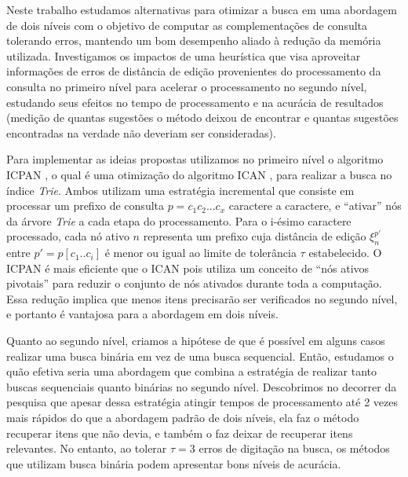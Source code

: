 Neste trabalho estudamos alternativas para otimizar a busca em uma abordagem de dois níveis com o objetivo de computar as complementações de consulta tolerando erros, mantendo um bom desempenho aliado à redução da memória utilizada. Investigamos os impactos de uma heurística que visa aproveitar informações de erros de distância de edição provenientes do processamento da consulta no primeiro nível para acelerar o processamento no segundo nível, estudando seus efeitos no tempo de processamento e na acurácia de resultados (medição de quantas sugestões o método deixou de encontrar e quantas sugestões encontradas na verdade não deveriam ser consideradas). 

Para implementar as ideias propostas utilizamos no primeiro nível o algoritmo ICPAN \citep{li2011efficient}, o qual é uma otimização do algoritmo ICAN \citep{ji2009efficient}, para realizar a busca no índice \textit{Trie}. Ambos utilizam uma estratégia incremental que consiste em processar um prefixo de consulta $p=c_{1}c_{2}...c_{x}$ caractere a caractere, e ``ativar'' nós da árvore \textit{Trie} a cada etapa do processamento. Para o i-ésimo caractere processado, cada nó ativo $n$ representa um prefixo cuja distância de edição $\xi_{n}^{p'}$ entre $p'=p[c_{1}..c_{i}]$ é menor ou igual ao limite de tolerância $\tau$ estabelecido. O ICPAN é mais eficiente que o ICAN pois utiliza um conceito de ``nós ativos pivotais'' para reduzir o conjunto de nós ativados durante toda a computação. Essa redução implica que menos itens precisarão ser verificados no segundo nível, e portanto é vantajosa para a abordagem em dois níveis.

Quanto ao segundo nível, criamos a hipótese de que é possível em alguns casos realizar uma busca binária em vez de uma busca sequencial. Então, estudamos o quão efetiva seria uma abordagem que combina a estratégia de realizar tanto buscas sequenciais quanto binárias no segundo nível. Descobrimos no decorrer da pesquisa que apesar dessa estratégia atingir tempos de processamento até 2 vezes mais rápidos do que a abordagem padrão de dois níveis, ela faz o método recuperar itens que não devia, e também o faz deixar de recuperar itens relevantes. No entanto, ao tolerar $\tau=3$ erros de digitação na busca, os métodos que utilizam busca binária podem apresentar bons níveis de acurácia.

